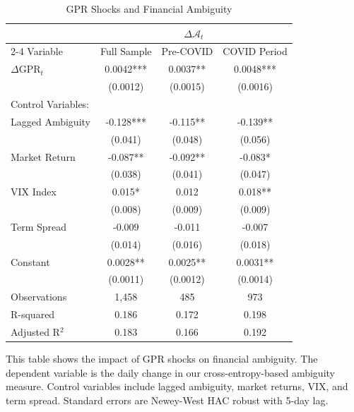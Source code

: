 \documentclass[preprint,12pt,authoryear]{elsarticle}
\begin{document}
\begin{table}[htbp]
\centering
\caption{GPR Shocks and Financial Ambiguity}
\label{tab:gpr_ambiguity}
\begin{threeparttable}
\begin{tabular*}{\textwidth}{@{\extracolsep{\fill}} lccc @{\extracolsep{\fill}}}
\toprule
& \multicolumn{3}{c}{$\Delta \mathcal{A}_{t}$} \\
\cmidrule(lr){2-4}
Variable & Full Sample & Pre-COVID & COVID Period \\
\midrule
\midrule
$\Delta$GPR$_t$ & 0.0042*** & 0.0037** & 0.0048*** \\
& (0.0012) & (0.0015) & (0.0016) \\
\midrule
Control Variables: & & & \\
Lagged Ambiguity & -0.128*** & -0.115** & -0.139** \\
& (0.041) & (0.048) & (0.056) \\
Market Return & -0.087** & -0.092** & -0.083* \\
& (0.038) & (0.041) & (0.047) \\
VIX Index & 0.015* & 0.012 & 0.018** \\
& (0.008) & (0.009) & (0.009) \\
Term Spread & -0.009 & -0.011 & -0.007 \\
& (0.014) & (0.016) & (0.018) \\
\midrule
Constant & 0.0028** & 0.0025** & 0.0031** \\
& (0.0011) & (0.0012) & (0.0014) \\
\midrule
Observations & 1,458 & 485 & 973 \\
R-squared & 0.186 & 0.172 & 0.198 \\
Adjusted R$^2$ & 0.183 & 0.166 & 0.192 \\
\bottomrule
\end{tabular*}
\begin{tablenotes}[flushleft]
\small
\item[] This table shows the impact of GPR shocks on financial ambiguity. The dependent variable is the daily change in our cross-entropy-based ambiguity measure. Control variables include lagged ambiguity, market returns, VIX, and term spread. Standard errors are Newey-West HAC robust with 5-day lag.
\end{tablenotes}
\end{threeparttable}
\end{table}
\end{document}
